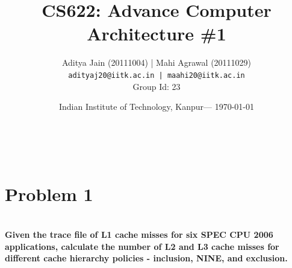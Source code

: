 \documentclass[]{article}
\title{CS622: Advance Computer Architecture \#1 } %
\author{Aditya Jain (20111004) | Mahi Agrawal (20111029)\\ 

\texttt{adityaj20@iitk.ac.in | maahi20@iitk.ac.in}\\Group Id: 23
}
\date{Indian Institute of Technology, Kanpur--- \today} %
\begin{document}
\maketitle %

\\
\section*{Problem 1} %
\\
\textbf{Given the trace file of L1 cache misses for six SPEC CPU 2006 applications, calculate the number of L2 and L3 cache misses for different cache hierarchy policies - inclusion, NINE, and exclusion.}
\end{document}
